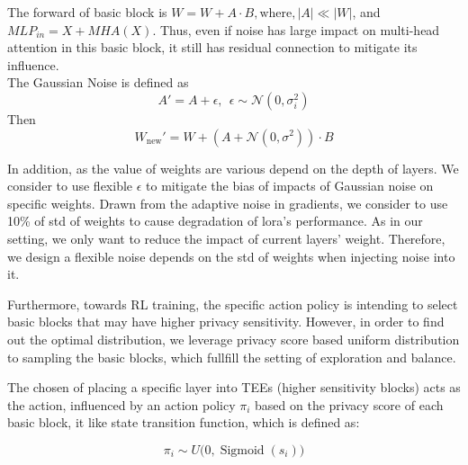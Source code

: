 \documentclass{article}
\begin{document}
The forward of basic block is $W = W + A \cdot B, \text{where}, |A| \ll |W|$, and $MLP_{in} = X + MHA(X)$. Thus, even if noise has large impact on multi-head attention in this basic block, it still has residual connection to mitigate its influence. \\
The Gaussian Noise is defined as 
\begin{equation}
   A' = A + \epsilon,\ \ \epsilon \sim \mathcal{N}(0,\sigma_i^2)
\end{equation}
Then
\begin{equation}
W_{\text{new}}' = W + (A + \mathcal{N}(0, \sigma^2)) \cdot B
\end{equation}

In addition, as the value of weights are various depend on the depth of layers. We consider to use flexible $\epsilon$ to mitigate the bias of impacts of Gaussian noise on specific weights. Drawn from the adaptive noise in gradients\cite{adamczewski2023differential_privacy,lee2018concentrated_privacy_budget}, we consider to use 10\% of std of weights to cause degradation of lora's performance. As in our setting, we only want to reduce the impact of current layers' weight. Therefore, we design a flexible noise depends on the std of weights when injecting noise into it.

Furthermore, towards RL training, the specific action policy is intending to select basic blocks that may have higher privacy sensitivity. However, in order to find out the optimal distribution, we leverage privacy score based uniform distribution to sampling the basic blocks, which fullfill the setting of exploration and balance. 

The chosen of placing a specific layer into TEEs (higher sensitivity blocks) acts as the action, influenced by an action policy $\pi_i$ based on the privacy score of each basic block, it like state transition function, which is defined as:

\begin{equation}
\pi_i \sim U\bigl(0, \operatorname{Sigmoid}(s_i)\bigr)
\label{eq:pi_distribution}
\end{equation}
\end{document}

